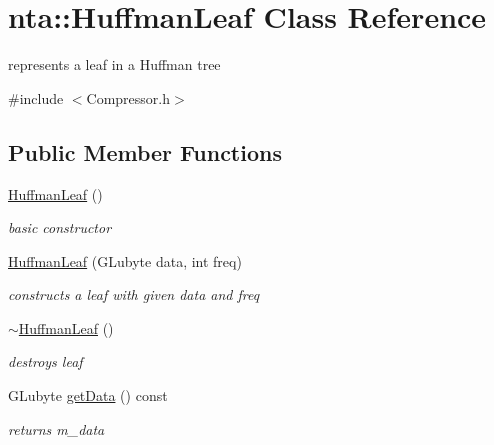 \hypertarget{classnta_1_1HuffmanLeaf}{}\section{nta\+:\+:Huffman\+Leaf Class Reference}
\label{classnta_1_1HuffmanLeaf}


represents a leaf in a Huffman tree  




{\ttfamily \#include $<$Compressor.\+h$>$}

\subsection*{Public Member Functions}
\begin{DoxyCompactItemize}
\item 
\mbox{\label{classnta_1_1HuffmanLeaf_afcd113b293d90d3297d409421bbfb285}} 
\hyperlink{classnta_1_1HuffmanLeaf_afcd113b293d90d3297d409421bbfb285}{Huffman\+Leaf} ()
\begin{DoxyCompactList}\small\item\em basic constructor \end{DoxyCompactList}\item 
\mbox{\label{classnta_1_1HuffmanLeaf_a68e98537fe635d83cc04a2ce70e99993}} 
\hyperlink{classnta_1_1HuffmanLeaf_a68e98537fe635d83cc04a2ce70e99993}{Huffman\+Leaf} (G\+Lubyte data, int freq)
\begin{DoxyCompactList}\small\item\em constructs a leaf with given data and freq \end{DoxyCompactList}\item 
\mbox{\label{classnta_1_1HuffmanLeaf_a579b5b814ae18f2230a07c186f96890f}} 
\hyperlink{classnta_1_1HuffmanLeaf_a579b5b814ae18f2230a07c186f96890f}{$\sim$\+Huffman\+Leaf} ()
\begin{DoxyCompactList}\small\item\em destroys leaf \end{DoxyCompactList}\item 
\mbox{\label{classnta_1_1HuffmanLeaf_aebdea9a65041b1bca7dc89a32a44d0f3}} 
G\+Lubyte \hyperlink{classnta_1_1HuffmanLeaf_aebdea9a65041b1bca7dc89a32a44d0f3}{get\+Data} () const
\begin{DoxyCompactList}\small\item\em returns m\+\_\+data \end{DoxyCompactList}\end{DoxyCompactItemize}
